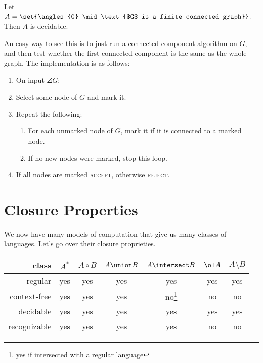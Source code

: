 \documentclass{standalone}
\begin{document}
\begin{example}
	Let \(A = \set{\angles{G} \mid \text{$G$ is a finite connected graph}}\). Then \(A\) is decidable.
\end{example}
An easy way to see this is to just run a connected component algorithm on \(G\), and then test whether the first connected component is the same as the whole graph. The implementation is as follows:
\begin{enumerate}[start=0]
	\item On input \(\angles{G}\):
	\item Select some node of \(G\) and mark it.
	\item Repeat the following:
	\begin{enumerate}[nosep]
		\item For each unmarked node of \(G\), mark it if it is connected to a marked node.
		\item If no new nodes were marked, stop this loop.
	\end{enumerate}
	\item If all nodes are marked \textsc{accept}, otherwise \textsc{reject}.
\end{enumerate}

\section{Closure Properties}
We now have many models of computation that give us many classes of languages. Let's go over their closure proprieties.

\begin{center}
	\begin{tabular}{r c c c c c c}
    \toprule
		class        & \(A^*\) & \(A \circ B\) & \(A \union B\) & \(A \intersect B\) & \(\ol A\) & \(A \setminus B\) \\ \midrule
		regular      & yes & yes & yes & yes & yes & yes \\
		context-free & yes & yes & yes & no\footnote{yes if intersected with a regular language} & no & no \\
		decidable    & yes & yes & yes & yes & yes & yes \\
		recognizable & yes & yes & yes & yes & no & no \\
    \bottomrule
	\end{tabular}
\end{center}
\end{document}
